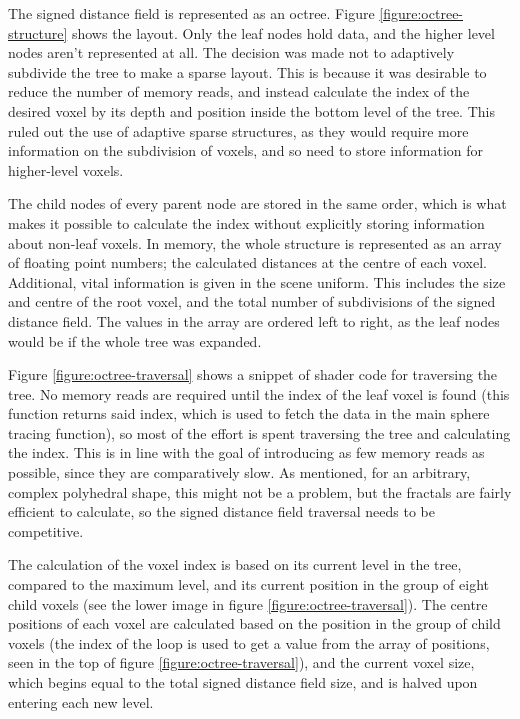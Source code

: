 The signed distance field is represented as an octree. Figure \ref{figure:octree-structure} shows the layout. Only the leaf nodes hold data, and the higher level nodes aren't represented at all. The decision was made not to adaptively subdivide the tree to make a sparse layout. This is because it was desirable to reduce the number of memory reads, and instead calculate the index of the desired voxel by its depth and position inside the bottom level of the tree. This ruled out the use of adaptive sparse structures, as they would require more information on the subdivision of voxels, and so need to store information for higher-level voxels.\newline

The child nodes of every parent node are stored in the same order, which is what makes it possible to calculate the index without explicitly storing information about non-leaf voxels. In memory, the whole structure is represented as an array of floating point numbers; the calculated distances at the centre of each voxel. Additional, vital information is given in the scene uniform. This includes the size and centre of the root voxel, and the total number of subdivisions of the signed distance field. The values in the array are ordered left to right, as the leaf nodes would be if the whole tree was expanded.\newline

Figure \ref{figure:octree-traversal} shows a snippet of shader code for traversing the tree. No memory reads are required until the index of the leaf voxel is found (this function returns said index, which is used to fetch the data in the main sphere tracing function), so most of the effort is spent traversing the tree and calculating the index. This is in line with the goal of introducing as few memory reads as possible, since they are comparatively slow. As mentioned, for an arbitrary, complex polyhedral shape, this might not be a problem, but the fractals are fairly efficient to calculate, so the signed distance field traversal needs to be competitive.\newline

The calculation of the voxel index is based on its current level in the tree, compared to the maximum level, and its current position in the group of eight child voxels (see the lower image in figure \ref{figure:octree-traversal}). The centre positions of each voxel are calculated based on the position in the group of child voxels (the index of the loop is used to get a value from the array of positions, seen in the top of figure \ref{figure:octree-traversal}), and the current voxel size, which begins equal to the total signed distance field size, and is halved upon entering each new level.

